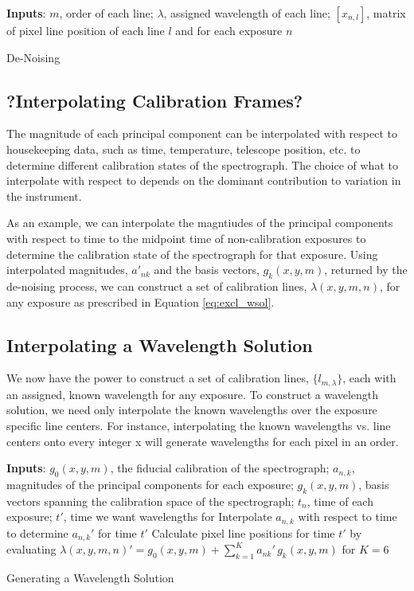 \documentclass[twocolumn]{aastex63}
\begin{document}
\begin{algorithm}
\SetAlgoLined
\textbf{Inputs}: $m$, order of each line; $\lambda$, assigned wavelength of each line; $[x_{n,l}] $, matrix of pixel line position of each line $l$ and for each exposure $n$\;
\While{change in missing or outlier line centers $>$ 0.01\%}{
	$g_0(x,y,m) = \overline{x_{n,l}]}$\;
	find $U, \Sigma, V$ s.t. $U\Sigma V^* = (x_{l,n}-g_0(x,y,m))$\;
	let $a_{n,k} = U\cdot \Sigma$ and $g_k(x,y,m) = V$\;
	$\lambda(x,y,m,n) = g_0(x,y,m) + \sum_{k=1}^K a_{nk}\,g_k(x,y,m)$ for $K=6$\;
	$[x_{n,l}] = \lambda(x,y,m,n)$ where $[x_{n,l}]$ was initially $NaN$
	}
\caption{De-Noising}
\end{algorithm}

\subsection{?Interpolating Calibration Frames?}
 \label{sec:interp_time}
The magnitude of each principal component can be interpolated with respect to housekeeping data, such as time, temperature, telescope position, etc. to determine different calibration states of the spectrograph.  The choice of what to interpolate with respect to depends on the dominant contribution to variation in the instrument.

As an example, we can interpolate the magntiudes of the principal components with respect to time to the midpoint time of non-calibration exposures to determine the calibration state of the spectrograph for that exposure.  Using interpolated magnitudes, $a'_{nk}$ and the basis vectors, $g_k(x,y,m)$, returned by the de-noising process, we can construct a set of calibration lines, $\lambda(x,y,m,n)$, for any exposure as prescribed in Equation \ref{eq:excl_wsol}.


\subsection{Interpolating a Wavelength Solution} \label{sec:interp_wsol}
We now have the power to construct a set of calibration lines, $\{l_{m,\lambda}\}$, each with an assigned, known wavelength for any exposure.  To construct a wavelength solution, we need only interpolate the known wavelengths over the exposure specific line centers.  For instance, interpolating the known wavelengths vs. line centers onto every integer x will generate wavelengths for each pixel in an order.

\begin{algorithm}
\SetAlgoLined
\textbf{Inputs}: $g_0(x,y,m)$, the fiducial calibration of the spectrograph; $a_{n,k}$, magnitudes of the principal components for each exposure; $g_k(x,y,m)$, basis vectors spanning the calibration space of the spectrograph; $t_n$, time of each exposure; $t'$, time we want wavelengths for\;
Interpolate $a_{n,k}$ with respect to time to determine $a_{n,k}'$ for time $t'$\;
Calculate pixel line positions for time $t'$ by evaluating\;
$\lambda(x,y,m,n)' = g_0(x,y,m) + \sum_{k=1}^K a_{nk}'\,g_k(x,y,m)$ for $K=6$\;
\caption{Generating a Wavelength Solution}
\end{algorithm}
\end{document}
